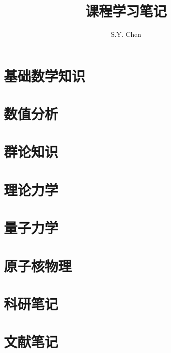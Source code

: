 \documentclass[lang=cn,12pt, scheme=chinese]{elegantbook}
\title{课程学习笔记}
\author{S.Y. Chen}
\begin{document}
\maketitle

\frontmatter
\tableofcontents

\mainmatter

\part{基础数学知识}



\part{数值分析}


\part{群论知识}


\part{理论力学}






\part{量子力学}






\part{原子核物理}





\part{科研笔记}




\part{文献笔记}


\appendix

\end{document}
